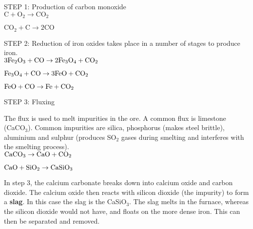 \begin{center}

STEP 1: Production of carbon monoxide\\

$\text{C} + \text{O}_{2} \rightarrow \text{CO}_{2}$

$\text{CO}_{2} + \text{C} \rightarrow 2\text{CO}$
\end{center}

\begin{center}
STEP 2: Reduction of iron oxides takes place in a number of stages to produce iron.\\

$\rm{3Fe_{2}O_{3} + CO \rightarrow 2Fe_{3}O_{4} + CO_{2}}$

$\rm{Fe_{3}O_{4} + CO \rightarrow 3FeO + CO_{2}}$

$\rm{FeO + CO \rightarrow Fe + CO_{2}}$
\end{center}

\begin{center}
STEP 3: Fluxing

The flux is used to melt impurities in the ore. A common flux is limestone (CaCO$_{3}$). Common impurities are silica, phosphorus (makes steel brittle), aluminium and sulphur (produces SO$_{2}$ gases during smelting and interferes with the smelting process).\\


$\rm{CaCO_{3} \rightarrow CaO + CO_{2}}$

$\rm{CaO + SiO_{2} \rightarrow CaSiO_{3}}$
\end{center}

In step 3, the calcium carbonate breaks down into calcium oxide and carbon dioxide. The calcium oxide then reacts with silicon dioxide (the impurity) to form a \textbf{slag}. In this case the slag is the CaSiO$_{3}$. The slag melts in the furnace, whereas the silicon dioxide would not have, and floats on the more dense iron. This can then be separated and removed.

